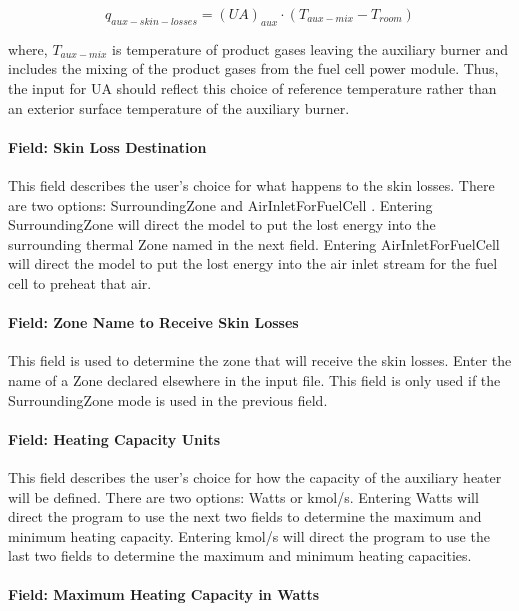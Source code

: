 \begin{equation}
{q_{aux - skin - losses}} = {(UA)_{aux}} \cdot ({T_{aux - mix}} - {T_{room}})
\end{equation}

where, \({T_{aux - mix}}\) is temperature of product gases leaving the auxiliary burner and includes the mixing of the product gases from the fuel cell power module. Thus, the input for UA should reflect this choice of reference temperature rather than an exterior surface temperature of the auxiliary burner.

\paragraph{Field: Skin Loss Destination}\label{field-skin-loss-destination}

This field describes the user's choice for what happens to the skin losses. There are two options: SurroundingZone and AirInletForFuelCell . Entering SurroundingZone will direct the model to put the lost energy into the surrounding thermal Zone named in the next field. Entering AirInletForFuelCell will direct the model to put the lost energy into the air inlet stream for the fuel cell to preheat that air.

\paragraph{Field: Zone Name to Receive Skin Losses}\label{field-zone-name-to-receive-skin-losses}

This field is used to determine the zone that will receive the skin losses. Enter the name of a Zone declared elsewhere in the input file. This field is only used if the SurroundingZone mode is used in the previous field.

\paragraph{Field: Heating Capacity Units}\label{field-heating-capacity-units}

This field describes the user's choice for how the capacity of the auxiliary heater will be defined. There are two options: Watts or kmol/s. Entering Watts will direct the program to use the next two fields to determine the maximum and minimum heating capacity. Entering kmol/s will direct the program to use the last two fields to determine the maximum and minimum heating capacities.

\paragraph{Field: Maximum Heating Capacity in Watts}\label{field-maximum-heating-capacity-in-watts}

